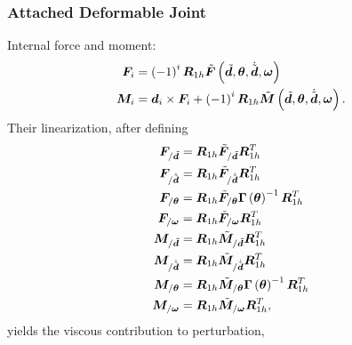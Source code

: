\documentclass[10pt,dvips,fleqn,subeqn]{report}
\newcommand{\T}[1]{\bm{#1}}
\begin{document}
\subsubsection{Attached Deformable Joint}
Internal force and moment:
\begin{subequations}
\begin{align}
	\T{F}_i &= \plbr{ -1 }^i \T{R}_{1h} \tilde{\T{F}}\plbr{\tilde{\T{d}}, \T{\theta}, \dot{\tilde{\T{d}}}, \T{\omega}} \\
	\T{M}_i &= \T{d}_i \times \T{F}_i
	+ \plbr{-1}^i \T{R}_{1h} \tilde{\T{M}}\plbr{\tilde{\T{d}}, \T{\theta}, \dot{\tilde{\T{d}}}, \T{\omega}} .
\end{align}
\end{subequations}
Their linearization, after defining
\begin{subequations}
\begin{align}
	\T{F}_{/\tilde{\T{d}}} &=
		\T{R}_{1h} \tilde{\T{F}}_{/\tilde{\T{d}}} \T{R}_{1h}^T \\
	\T{F}_{/\dot{\tilde{\T{d}}}} &=
		\T{R}_{1h} \tilde{\T{F}}_{/\dot{\tilde{\T{d}}}} \T{R}_{1h}^T \\
	\T{F}_{/\T{\theta}}
		&= \T{R}_{1h} \tilde{\T{F}}_{/\T{\theta}} \T{\Gamma}\plbr{\T{\theta}}^{-1} \T{R}_{1h}^T \\
	\T{F}_{/\T{\omega}}
		&= \T{R}_{1h} \tilde{\T{F}}_{/\T{\omega}} \T{R}_{1h}^T \\
	\T{M}_{/\tilde{\T{d}}} &=
		\T{R}_{1h} \tilde{\T{M}}_{/\tilde{\T{d}}} \T{R}_{1h}^T \\
	\T{M}_{/\dot{\tilde{\T{d}}}} &=
		\T{R}_{1h} \tilde{\T{M}}_{/\dot{\tilde{\T{d}}}} \T{R}_{1h}^T \\
	\T{M}_{/\T{\theta}}
		&= \T{R}_{1h} \tilde{\T{M}}_{/\T{\theta}} \T{\Gamma}\plbr{\T{\theta}}^{-1} \T{R}_{1h}^T \\
	\T{M}_{/\T{\omega}}
		&= \T{R}_{1h} \tilde{\T{M}}_{/\T{\omega}} \T{R}_{1h}^T ,
\end{align}
\end{subequations}
yields the viscous contribution to perturbation,
\end{document}
